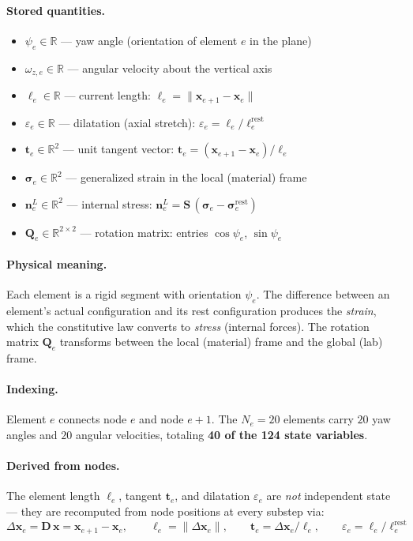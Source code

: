 \documentclass[11pt]{article}
\newcommand{\vect}[1]{\mathbf{#1}}
\newcommand{\mat}[1]{\mathbf{#1}}
\newcommand{\Real}{\mathbb{R}}
\begin{document}
\paragraph{Stored quantities.}
\begin{itemize}
  \item $\psi_e \in \Real$ --- yaw angle (orientation of element $e$ in the plane)
  \item $\omega_{z,e} \in \Real$ --- angular velocity about the vertical axis
  \item $\ell_e \in \Real$ --- current length: $\ell_e = \|\vect{x}_{e+1} - \vect{x}_e\|$
  \item $\varepsilon_e \in \Real$ --- dilatation (axial stretch): $\varepsilon_e = \ell_e / \ell_e^{\text{rest}}$
  \item $\vect{t}_e \in \Real^2$ --- unit tangent vector: $\vect{t}_e = (\vect{x}_{e+1} - \vect{x}_e) / \ell_e$
  \item $\bm{\sigma}_e \in \Real^2$ --- generalized strain in the local (material) frame
  \item $\vect{n}_e^L \in \Real^2$ --- internal stress: $\vect{n}_e^L = \mat{S}\,(\bm{\sigma}_e - \bm{\sigma}_e^{\text{rest}})$
  \item $\mat{Q}_e \in \Real^{2 \times 2}$ --- rotation matrix: entries $\cos\psi_e$, $\sin\psi_e$
\end{itemize}

\paragraph{Physical meaning.}
Each element is a rigid segment with orientation $\psi_e$.
The difference between an element's actual configuration and its rest configuration produces the \emph{strain}, which the constitutive law converts to \emph{stress} (internal forces).
The rotation matrix $\mat{Q}_e$ transforms between the local (material) frame and the global (lab) frame.

\paragraph{Indexing.}
Element $e$ connects node $e$ and node $e+1$.
The $N_e = 20$ elements carry $20$ yaw angles and $20$ angular velocities, totaling \textbf{40 of the 124 state variables}.

\paragraph{Derived from nodes.}
The element length $\ell_e$, tangent $\vect{t}_e$, and dilatation $\varepsilon_e$ are \emph{not} independent state --- they are recomputed from node positions at every substep via:
\begin{equation}
  \Delta\vect{x}_e = \mat{D}\,\vect{x} = \vect{x}_{e+1} - \vect{x}_e, \qquad
  \ell_e = \|\Delta\vect{x}_e\|, \qquad
  \vect{t}_e = \Delta\vect{x}_e / \ell_e, \qquad
  \varepsilon_e = \ell_e / \ell_e^{\text{rest}}
\end{equation}
\end{document}
